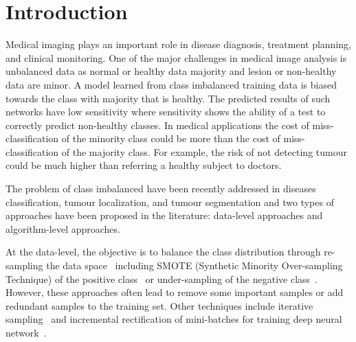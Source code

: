 \documentclass[10pt,twocolumn,letterpaper]{article}
\begin{document}
\section{Introduction}\label{intro}
Medical imaging plays an important role in disease diagnosis, treatment planning, and clinical monitoring. One of the major challenges in medical image analysis is unbalanced data as normal or healthy data majority and lesion or non-healthy data are minor. A model learned from class imbalanced training data is biased towards the class with majority that is healthy. The predicted results of such networks have low sensitivity where sensitivity shows the ability of a test to correctly predict non-healthy classes. In medical applications the cost of miss-classification of the minority class could be more than the cost of miss-classification of the majority class. For example, the risk of not detecting tumour could be much higher than referring a healthy subject to doctors. 

The problem of class imbalanced have been recently addressed in diseases classification, tumour localization, and tumour segmentation and two types of approaches have been proposed in the literature: data-level approaches and algorithm-level approaches.

At the data-level, the objective is to balance the class distribution through re-sampling the data space~\cite{kohli2017medical} including SMOTE (Synthetic Minority Over-sampling Technique) of the positive class~\cite{douzas2018effective,mariani2018bagan} or under-sampling of the negative class~\cite{6914453}.
However, these approaches often lead to remove some important samples or add redundant samples to the training set.
Other techniques include iterative sampling~\cite{morales2012image} and incremental rectification of mini-batches for training deep neural network~\cite{dong2018imbalanced}.
\end{document}
